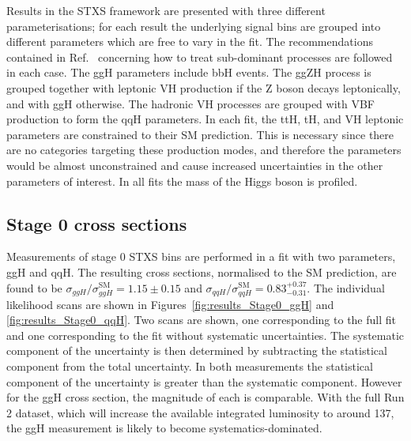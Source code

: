Results in the STXS framework are presented with three different parameterisations;
for each result the underlying signal bins 
are grouped into different parameters which are free to vary in the fit.
The recommendations contained in Ref.~\cite{YR4} 
concerning how to treat sub-dominant processes are followed in each case.
The ggH parameters include bbH events.
The ggZH process is grouped together with leptonic VH production if the Z boson decays leptonically, 
and with ggH otherwise.
The hadronic VH processes are grouped with VBF production to form the qqH parameters.
In each fit, the ttH, tH, and VH leptonic parameters are constrained to their SM prediction. 
This is necessary since there are no categories targeting these production modes, 
and therefore the parameters would be almost unconstrained 
and cause increased uncertainties in the other parameters of interest.
In all fits the mass of the Higgs boson is profiled.

\subsection{Stage 0 cross sections}
Measurements of stage 0 STXS bins are performed in a fit with two parameters, ggH and qqH.
The resulting cross sections, normalised to the SM prediction, are found to be 
$\sigma_{ggH}/\sigma_{ggH}^{\textrm{SM}} = 1.15 \pm 0.15$ 
and $\sigma_{qqH}/\sigma_{qqH}^{\textrm{SM}} = 0.83_{-0.31}^{+0.37}$.
The individual likelihood scans are shown 
in Figures~\ref{fig:results_Stage0_ggH} and \ref{fig:results_Stage0_qqH}.
Two scans are shown, one corresponding to the full fit
and one corresponding to the fit without systematic uncertainties.
The systematic component of the uncertainty is then determined 
by subtracting the statistical component from the total uncertainty.
In both measurements the statistical component of the uncertainty 
is greater than the systematic component.
However for the ggH cross section, the magnitude of each is comparable.
With the full Run 2 dataset, 
which will increase the available integrated luminosity to around \SI{137}{\fbinv}, 
the ggH measurement is likely to become systematics-dominated.

